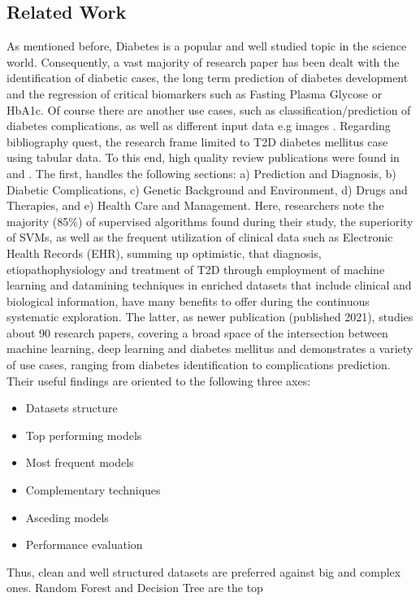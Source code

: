 \documentclass[journal,article,submit,pdftex,moreauthors]{Definitions/mdpi}
\begin{document}
\subsection{Related Work}
As mentioned before, Diabetes is a popular and well studied topic in the science world. Consequently, a vast majority of research
paper has been dealt with the identification of diabetic cases, the long term prediction of diabetes development and the regression
of critical biomarkers such as Fasting Plasma Glycose or HbA1c. Of course there are another use cases, such as classification/prediction
of diabetes complications, as well as different input data e.g images \cite{KAVAKIOTIS2017104,Fregoso}. Regarding bibliography quest, the research frame limited
to T2D diabetes mellitus case using tabular data. To this end, high quality review publications were found in \cite{KAVAKIOTIS2017104}
and \cite{Fregoso}. The first, handles the following sections: a) Prediction and Diagnosis, b) Diabetic Complications, c) Genetic Background and Environment,
d) Drugs and Therapies, and
e) Health Care and Management. Here, researchers note the majority (85\%) of supervised algorithms found during their study,
the superiority of SVMs, as well as the frequent utilization of clinical data such as Electronic Health Records (EHR), summing up
optimistic, that diagnosis, etiopathophysiology and treatment of T2D through employment of machine learning and datamining techniques
in enriched datasets that include clinical and biological information, have many benefits to offer during the 
continuous systematic exploration. The latter, as newer publication (published 2021), studies about 90 research papers, covering a
broad space of the intersection between machine learning, deep learning and diabetes mellitus and demonstrates a variety of use cases, ranging from
diabetes identification to complications prediction. Their useful findings are oriented to the following three axes:
\begin{itemize}
	\item Datasets structure
	\item Top performing models
	\item Most frequent models
	\item Complementary techniques
	\item Asceding models
	\item Performance evaluation
\end{itemize}
Thus, clean and well structured datasets are preferred against big and complex ones. Random Forest and Decision Tree are the top
\end{document}
